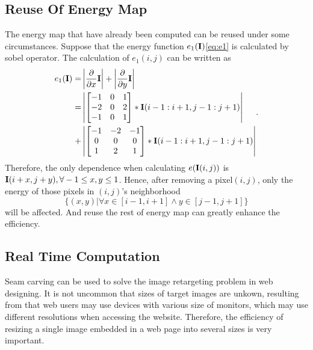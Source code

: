 \documentclass[final]{cvpr}
\begin{document}
\subsection{Reuse Of Energy Map}
The energy map that have already been computed can be reused under some circumstances.
Suppose that the energy function $e_1(\textbf I)$\ref{eq:e1} is calculated by sobel operator.
The calculation of $e_1(i,j)$ can be written as
\begin{equation}
    \begin{aligned}
        e_1(\textbf{I})=&\left|\frac\partial{\partial x}\textbf I\right|+\left|\frac\partial{\partial y}\textbf I\right|\\
        =&\left|
        \begin{bmatrix}
            -1 & 0 & 1\\
            -2 & 0 & 2\\
            -1 & 0 & 1
        \end{bmatrix}
        *\textbf I(i-1:i+1,j-1:j+1)\right|\\
        +&\left|
        \begin{bmatrix}
            -1 & -2 & -1\\
            0 & 0 & 0\\
            1 & 2 & 1
        \end{bmatrix}
        *\textbf I(i-1:i+1,j-1:j+1)\right|\\
    \end{aligned}.
    \label{eq:sobel}
\end{equation}
Therefore, the only dependence when calculating $e(\textbf I(i,j))$ is $\textbf I(i+x,j+y),\forall -1\le x,y\le 1$.
Hence, after removing a pixel$(i,j)$, only the energy of those pixels in $(i,j)$'s neighborhood
\begin{equation}
    \{(x,y)|\forall x\in[i-1,i+1]\wedge y\in[j-1,j+1]\}
    \label{eq:neighborhood}
\end{equation}
will be affected. And reuse the rest of energy map can greatly enhance the efficiency.
\subsection{Real Time Computation}
Seam carving can be used to solve the image retargeting problem in web designing.
It is not uncommon that sizes of target images are unkown, resulting from that web users may use devices with various size of monitors, which may use different resolutions when accessing the website.
Therefore, the efficiency of resizing a single image embedded in a web page into several sizes is very important.
\end{document}
